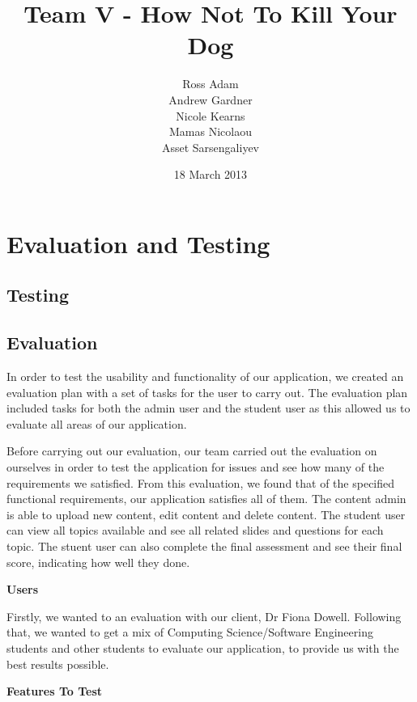 \documentclass{l3proj}
\begin{document}
\title{Team V - How Not To Kill Your Dog}
\author{Ross Adam \\
        Andrew Gardner \\
        Nicole Kearns \\
        Mamas Nicolaou \\
        Asset Sarsengaliyev}
\date{18 March 2013}
\maketitle
\tableofcontents

\chapter{Evaluation and Testing}
\label{evaluation}

\section{Testing}

\section{Evaluation}

In order to test the usability and functionality of our application, we created an evaluation plan with a set of tasks for the user to carry out. The evaluation plan included tasks for both the admin user and the student user as this allowed us to evaluate all areas of our application.

Before carrying out our evaluation, our team carried out the evaluation on ourselves in order to test the application for issues and see how many of the requirements we satisfied. From this evaluation, we found that of the specified functional requirements, our application satisfies all of them. The content admin is able to upload new content, edit content and delete content. The student user can view all topics available and see all related slides and questions for each topic. The stuent user can also complete the final assessment and see their final score, indicating how well they done.

\textbf{Users}

Firstly, we wanted to an evaluation with our client, Dr Fiona Dowell. Following that, we wanted to get a mix of Computing Science/Software Engineering students and other students to evaluate our application, to provide us with the best results possible.

\textbf{Features To Test}
\end{document}
